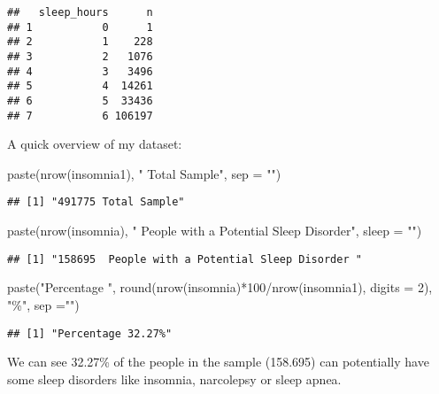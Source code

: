 \documentclass[
]{article}
\newenvironment{Shaded}{\begin{snugshade}}{\end{snugshade}}
\newcommand{\AttributeTok}[1]{\textcolor[rgb]{0.77,0.63,0.00}{#1}}
\newcommand{\DecValTok}[1]{\textcolor[rgb]{0.00,0.00,0.81}{#1}}
\newcommand{\FunctionTok}[1]{\textcolor[rgb]{0.00,0.00,0.00}{#1}}
\newcommand{\NormalTok}[1]{#1}
\newcommand{\SpecialCharTok}[1]{\textcolor[rgb]{0.00,0.00,0.00}{#1}}
\newcommand{\StringTok}[1]{\textcolor[rgb]{0.31,0.60,0.02}{#1}}
\begin{document}
\begin{verbatim}
##   sleep_hours      n
## 1           0      1
## 2           1    228
## 3           2   1076
## 4           3   3496
## 5           4  14261
## 6           5  33436
## 7           6 106197
\end{verbatim}

A quick overview of my dataset:

\begin{Shaded}
\begin{Highlighting}[]
\FunctionTok{paste}\NormalTok{(}\FunctionTok{nrow}\NormalTok{(insomnia1), }\StringTok{" Total Sample"}\NormalTok{, }\AttributeTok{sep =} \StringTok{""}\NormalTok{)}
\end{Highlighting}
\end{Shaded}

\begin{verbatim}
## [1] "491775 Total Sample"
\end{verbatim}

\begin{Shaded}
\begin{Highlighting}[]
\FunctionTok{paste}\NormalTok{(}\FunctionTok{nrow}\NormalTok{(insomnia), }\StringTok{" People with a Potential Sleep Disorder"}\NormalTok{, }\AttributeTok{sleep =} \StringTok{""}\NormalTok{)}
\end{Highlighting}
\end{Shaded}

\begin{verbatim}
## [1] "158695  People with a Potential Sleep Disorder "
\end{verbatim}

\begin{Shaded}
\begin{Highlighting}[]
\FunctionTok{paste}\NormalTok{(}\StringTok{"Percentage "}\NormalTok{, }\FunctionTok{round}\NormalTok{(}\FunctionTok{nrow}\NormalTok{(insomnia)}\SpecialCharTok{*}\DecValTok{100}\SpecialCharTok{/}\FunctionTok{nrow}\NormalTok{(insomnia1), }\AttributeTok{digits =} \DecValTok{2}\NormalTok{), }\StringTok{"\%"}\NormalTok{, }\AttributeTok{sep =}\StringTok{""}\NormalTok{)}
\end{Highlighting}
\end{Shaded}

\begin{verbatim}
## [1] "Percentage 32.27%"
\end{verbatim}

We can see 32.27\% of the people in the sample (158.695) can potentially
have some sleep disorders like insomnia, narcolepsy or sleep apnea.
\end{document}
